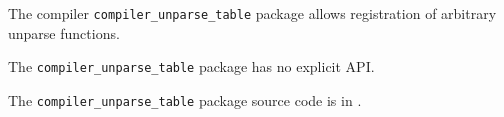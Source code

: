 

The compiler {\tt compiler\_unparse\_table} package allows registration 
of arbitrary unparse functions.

The {\tt compiler\_unparse\_table} package has no explicit API.

The {\tt compiler\_unparse\_table} package source code is in .
